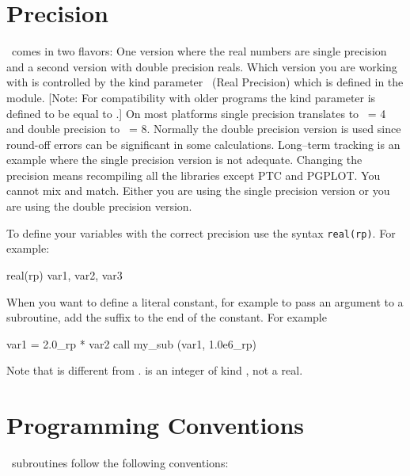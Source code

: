 \section{Precision}
\label{s:precision}

\bmad\ comes in two flavors: One version where the real numbers are single
precision and a second version with double precision reals. Which
version you are working with is controlled by the kind parameter \
(Real Precision) which is defined in the 
module. [Note: For compatibility with older programs the kind parameter
\vn{rdef} is defined to be equal to .]  On most platforms single
precision translates to \vn{rp}\ = 4 and double precision to \vn{rp}\ =
8. Normally the double precision version is used since round-off
errors can be significant in some calculations. Long--term tracking is
an example where the single precision version is not adequate. Changing 
the precision means recompiling all the libraries except PTC and PGPLOT. 
You cannot mix and match. Either you are using the single precision version
or you are using the double precision version.

To define your variables with the correct precision use the syntax
{\tt real(rp)}. For example:
\begin{example}
    real(rp) var1, var2, var3
\end{example}
When you want to define a literal constant, for example to pass an
argument to a subroutine, add the suffix \vn{_rp} to the end of the
constant. For example
\begin{example}
   var1 =  2.0_rp * var2
   call my_sub (var1, 1.0e6_rp)
\end{example}
Note that  is different from .  is an
integer of kind \vn{rp}, not a real.


\section{Programming Conventions}

\bmad\ subroutines follow the following conventions:

